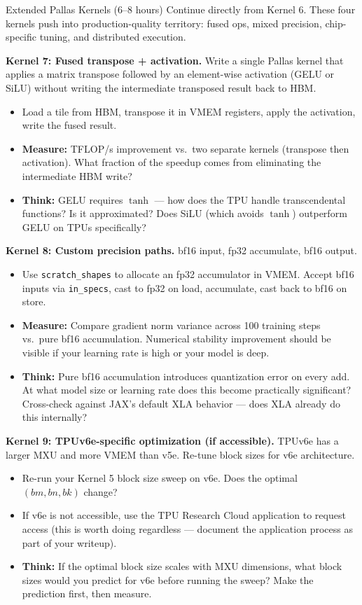 \begin{exercise}{Extended Pallas Kernels (6--8 hours)}
Continue directly from Kernel 6. These four kernels push into production-quality territory: fused ops, mixed precision, chip-specific tuning, and distributed execution.

\textbf{Kernel 7: Fused transpose + activation.} Write a single Pallas kernel that applies a matrix transpose followed by an element-wise activation (GELU or SiLU) without writing the intermediate transposed result back to HBM.

\begin{itemize}
  \item Load a tile from HBM, transpose it in VMEM registers, apply the activation, write the fused result.
  \item \textbf{Measure:} TFLOP/s improvement vs.\ two separate kernels (transpose then activation). What fraction of the speedup comes from eliminating the intermediate HBM write?
  \item \textbf{Think:} GELU requires $\tanh$ --- how does the TPU handle transcendental functions? Is it approximated? Does SiLU (which avoids $\tanh$) outperform GELU on TPUs specifically?
\end{itemize}

\textbf{Kernel 8: Custom precision paths.} bf16 input, fp32 accumulate, bf16 output.

\begin{itemize}
  \item Use \texttt{scratch\_shapes} to allocate an fp32 accumulator in VMEM. Accept bf16 inputs via \texttt{in\_specs}, cast to fp32 on load, accumulate, cast back to bf16 on store.
  \item \textbf{Measure:} Compare gradient norm variance across 100 training steps vs.\ pure bf16 accumulation. Numerical stability improvement should be visible if your learning rate is high or your model is deep.
  \item \textbf{Think:} Pure bf16 accumulation introduces quantization error on every add. At what model size or learning rate does this become practically significant? Cross-check against JAX's default XLA behavior --- does XLA already do this internally?
\end{itemize}

\textbf{Kernel 9: TPUv6e-specific optimization (if accessible).} TPUv6e has a larger MXU and more VMEM than v5e. Re-tune block sizes for v6e architecture.

\begin{itemize}
  \item Re-run your Kernel 5 block size sweep on v6e. Does the optimal $(bm, bn, bk)$ change?
  \item If v6e is not accessible, use the TPU Research Cloud application to request access (this is worth doing regardless --- document the application process as part of your writeup).
  \item \textbf{Think:} If the optimal block size scales with MXU dimensions, what block sizes would you predict for v6e before running the sweep? Make the prediction first, then measure.
\end{itemize}


\end{exercise}
